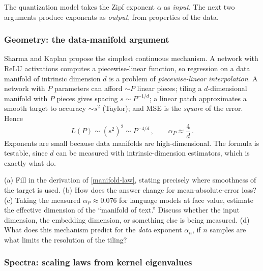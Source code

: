 \documentclass[11pt]{article}
\begin{document}
The quantization model takes the Zipf exponent $\alpha$ as \emph{input}. The next two arguments produce exponents as \emph{output}, from properties of the data.

\subsubsection{Geometry: the data-manifold argument}

Sharma and Kaplan \cite{sharma2020neural} propose the simplest continuous mechanism. A network with ReLU activations computes a piecewise-linear function, so regression on a data manifold of intrinsic dimension $d$ is a problem of \emph{piecewise-linear interpolation}. A network with $P$ parameters can afford $\sim P$ linear pieces; tiling a $d$-dimensional manifold with $P$ pieces gives spacing $s \sim P^{-1/d}$; a linear patch approximates a smooth target to accuracy $\sim s^2$ (Taylor); and MSE is the \emph{square} of the error. Hence
%
\begin{equation} \label{manifold-law}
    L(P) \sim (s^2)^2 \sim P^{-4/d}\,,\qquad \alpha_P \approx \frac{4}{d}\,.
\end{equation}
%
Exponents are small because data manifolds are high-dimensional. The formula is testable, since $d$ can be measured with intrinsic-dimension estimators, which is exactly what \cite{sharma2020neural} do.

\begin{exercise}
\label{ex:manifold}
(a) Fill in the derivation of \eqref{manifold-law}, stating precisely where smoothness of the target is used. (b) How does the answer change for mean-absolute-error loss? (c) Taking the measured $\alpha_P\approx0.076$ for language models at face value, estimate the effective dimension of the ``manifold of text.'' Discuss whether the input dimension, the embedding dimension, or something else is being measured. (d) What does this mechanism predict for the \emph{data} exponent $\alpha_n$, if $n$ samples are what limits the resolution of the tiling?
\end{exercise}


\subsubsection{Spectra: scaling laws from kernel eigenvalues}
\end{document}
